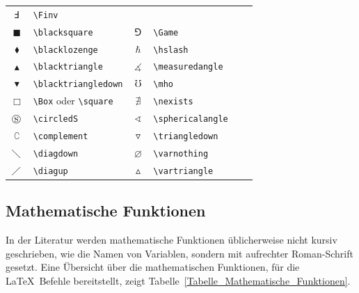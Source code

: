 \documentclass[a4paper,10pt,twoside]{scrbook}
\begin{document}
{\begin{table}[h!tb]
\begin{tabular}{clclcl}
$\Finv$ & \texttt{\textbackslash Finv} \\
$\blacksquare$ & \texttt{\textbackslash blacksquare} & 
$\Game$ & \texttt{\textbackslash Game} \\
$\blacklozenge$ & \texttt{\textbackslash blacklozenge} &
$\hslash$ & \texttt{\textbackslash hslash} \\
$\blacktriangle$ & \texttt{\textbackslash blacktriangle} &
$\measuredangle$ & \texttt{\textbackslash measuredangle} \\
$\blacktriangledown$ & \texttt{\textbackslash blacktriangledown}&
$\mho$ & \texttt{\textbackslash mho} \\
$\Box$ & \texttt{\textbackslash Box} oder \texttt{\textbackslash square}&
$\nexists$ & \texttt{\textbackslash nexists} \\
$\circledS$ & \texttt{\textbackslash circledS} &
$\sphericalangle$ & \texttt{\textbackslash sphericalangle}\\
$\complement$ & \texttt{\textbackslash complement} &
$\triangledown$ & \texttt{\textbackslash triangledown} \\
$\diagdown$ & \texttt{\textbackslash diagdown} &
$\varnothing$ & \texttt{\textbackslash varnothing} \\
$\diagup$ & \texttt{\textbackslash diagup} &
$\vartriangle$ & \texttt{\textbackslash vartriangle} \\ 
\hline
\end{tabular}
\end{table}

\subsection{Mathematische Funktionen}

In der Literatur werden mathematische Funktionen üblicherweise nicht kursiv geschrieben, wie
die Namen von Variablen, sondern mit aufrechter Roman-Schrift gesetzt. Eine Übersicht über die mathematischen
Funktionen, für die \LaTeX\ Befehle bereitstellt, zeigt Tabelle~\ref{Tabelle_Mathematische_Funktionen}.


}
\end{document}
